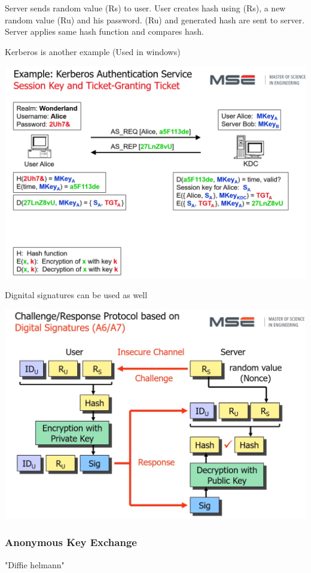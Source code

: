 \documentclass[12pt]{article}
\begin{document}
Server sends random value (Rs) to user. User creates hash using (Rs), a new random value (Ru) and his password.
(Ru) and generated hash are sent to server. Server applies same hash function and compares hash.

Kerberos is another example (Used in windows)

\includegraphics[width=\textwidth]{KerberosAuthenticationService.png}

Dignital signatures can be used as well

\includegraphics[width=\textwidth]{ChallengeResponseBasedOnDigitalSignatures.png}

\subsubsection*{Anonymous Key Exchange}
"Diffie helmann"
\end{document}
